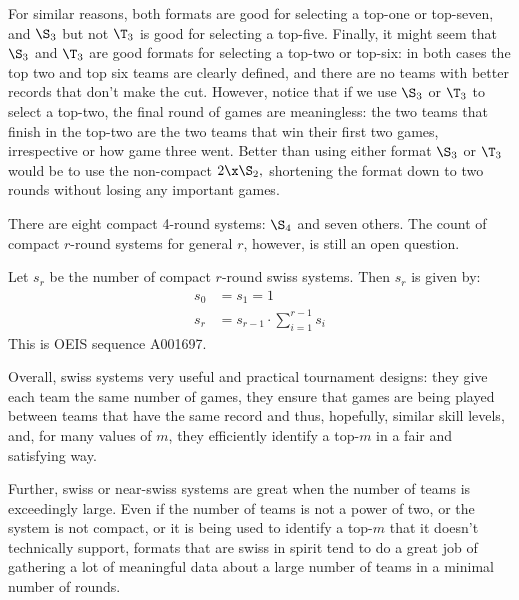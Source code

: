 {    For similar reasons, both formats are good for selecting a top-one or top-seven, and $\S_3$ but not $\T_3$ is good for selecting a top-five. Finally, it might seem that $\S_3$ and $\T_3$ are good formats for selecting a top-two or top-six: in both cases the top two and top six teams are clearly defined, and there are no teams with better records that don't make the cut. However, notice that if we use $\S_3$ or $\T_3$ to select a top-two, the final round of games are meaningless: the two teams that finish in the top-two are the two teams that win their first two games, irrespective or how game three went. Better than using either format $\S_3$ or $\T_3$ would be to use the non-compact $2\x\S_2,$ shortening the format down to two rounds without losing any important games.

    There are eight compact 4-round systems: $\S_4$ and seven others. The count of compact $r$-round systems for general $r$, however, is still an open question.

    \begin{conj}{}{}
        Let $s_r$ be the number of compact $r$-round swiss systems. Then $s_r$ is given by:
        \begin{align*}
            s_0 &= s_ 1 = 1\\
            s_r &= s_{r-1} \cdot \sum_{i=1}^{r-1}s_i
        \end{align*}
        This is OEIS sequence A001697.
    \end{conj}

    Overall, swiss systems very useful and practical tournament designs: they give each team the same number of games, they ensure that games are being played between teams that have the same record and thus, hopefully, similar skill levels, and, for many values of $m$, they efficiently identify a top-$m$ in a fair and satisfying way.

    Further, swiss or near-swiss systems are great when the number of teams is exceedingly large. Even if the number of teams is not a power of two, or the system is not compact, or it is being used to identify a top-$m$ that it doesn't technically support, formats that are swiss in spirit tend to do a great job of gathering a lot of meaningful data about a large number of teams in a minimal number of rounds.
}



